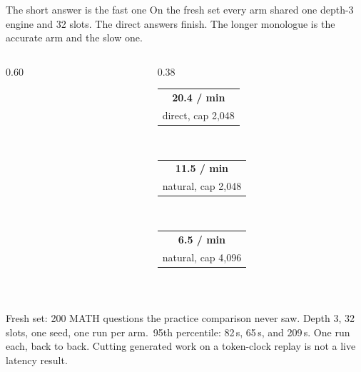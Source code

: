 \documentclass[aspectratio=169,11pt]{beamer}
\makeatletter
\newcommand{\src}[1]{\par\vfill\begin{minipage}{0.96\textwidth}\color{muted}\tiny #1\end{minipage}\vspace{-0.2em}}
\newcommand{\bignum}[3][ink]{%
  \begin{tabular}{@{}c@{}}
    {\color{#1}\fontsize{18}{20}\selectfont\bfseries #2}\\[3pt]
    \parbox{3.2cm}{\centering\scriptsize\color{muted} #3}
  \end{tabular}}
\newcommand{\Fresh}{Fresh set: 200 MATH questions the practice comparison never saw. Depth 3, 32 slots, one seed, one run per arm.}
\makeatother
\begin{document}
\begin{frame}{The short answer is the fast one}
  On the fresh set every arm shared one depth-3 engine and 32 slots.
  The direct answers finish. The longer monologue is the accurate arm and the slow one.
  \vspace{0.05em}
  \begin{columns}[c]
    \begin{column}{0.60\textwidth}
    \end{column}
    \begin{column}{0.38\textwidth}
      \bignum[accent]{20.4 / min}{direct, cap 2{,}048}\\[0.7em]
      \bignum{11.5 / min}{natural, cap 2{,}048}\\[0.7em]
      \bignum{6.5 / min}{natural, cap 4{,}096}\\
    \end{column}
  \end{columns}
  \src{\Fresh\ 95th percentile: 82\,s, 65\,s, and 209\,s. One run each, back to back.
  Cutting generated work on a token-clock replay is not a live latency result.}
\end{frame}
\end{document}

